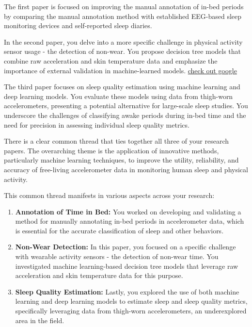 \documentclass[
  8pt,
  letterpaper,
  DIV=11,
  numbers=noendperiod]{scrartcl}
\begin{document}
The first paper is focused on improving the manual annotation of in-bed
periods by comparing the manual annotation method with established
EEG-based sleep monitoring devices and self-reported sleep diaries.

In the second paper, you delve into a more specific challenge in
physical activity sensor usage - the detection of non-wear. You propose
decision tree models that combine raw acceleration and skin temperature
data and emphasize the importance of external validation in
machine-learned models. \href{www.google.com}{check out google}

The third paper focuses on sleep quality estimation using machine
learning and deep learning models. You evaluate these models using data
from thigh-worn accelerometers, presenting a potential alternative for
large-scale sleep studies. You underscore the challenges of classifying
awake periods during in-bed time and the need for precision in assessing
individual sleep quality metrics.

There is a clear common thread that ties together all three of your
research papers. The overarching theme is the application of innovative
methods, particularly machine learning techniques, to improve the
utility, reliability, and accuracy of free-living accelerometer data in
monitoring human sleep and physical activity.

This common thread manifests in various aspects across your research:

\begin{enumerate}
\def\labelenumi{\arabic{enumi}.}
\item
  \textbf{Annotation of Time in Bed:} You worked on developing and
  validating a method for manually annotating in-bed periods in
  accelerometer data, which is essential for the accurate classification
  of sleep and other behaviors.
\item
  \textbf{Non-Wear Detection:} In this paper, you focused on a specific
  challenge with wearable activity sensors - the detection of non-wear
  time. You investigated machine learning-based decision tree models
  that leverage raw acceleration and skin temperature data for this
  purpose.
\item
  \textbf{Sleep Quality Estimation:} Lastly, you explored the use of
  both machine learning and deep learning models to estimate sleep and
  sleep quality metrics, specifically leveraging data from thigh-worn
  accelerometers, an underexplored area in the field.
\end{enumerate}
\end{document}

